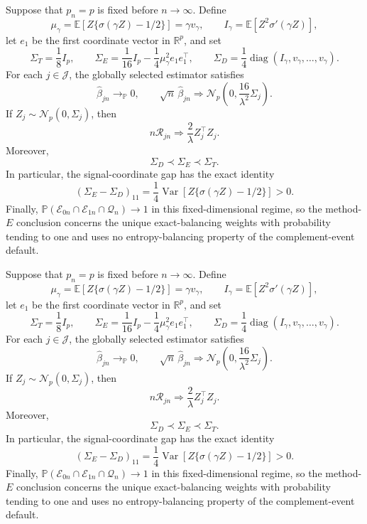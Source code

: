 Suppose that \(p_n=p\) is fixed before \(n\to\infty\).  Define
\[
 \mu_\gamma=\mathbb E\!\left[Z\{\sigma(\gamma Z)-1/2\}\right]
 =\gamma v_\gamma,
 \qquad
 I_\gamma=\mathbb E\!\left[Z^2\sigma'(\gamma Z)\right],
\]
let \(e_1\) be the first coordinate vector in \(\mathbb R^p\), and set
\[
 \Sigma_T=\frac18 I_p,
 \qquad
 \Sigma_E=\frac1{16}I_p-\frac14\mu_\gamma^2e_1e_1^\top,
 \qquad
 \Sigma_D=\frac14\operatorname{diag}(I_\gamma,v_\gamma,\ldots,v_\gamma).
\]
For each \(j\in\mathcal J\), the globally selected estimator satisfies
\[
 \widehat\beta_{jn}\longrightarrow_{\mathbb P}0,
 \qquad
 \sqrt n\,\widehat\beta_{jn}\Rightarrow
 \mathcal N_p\!\left(0,\frac{16}{\lambda^2}\Sigma_j\right).
\]
If \(Z_j\sim\mathcal N_p(0,\Sigma_j)\), then
\[
 n\mathcal R_{jn}\Rightarrow \frac2\lambda Z_j^\top Z_j.
\]
Moreover,
\[
 \Sigma_D\prec\Sigma_E\prec\Sigma_T.
\]
In particular, the signal-coordinate gap has the exact identity
\[
 (\Sigma_E-\Sigma_D)_{11}
 =\frac14\operatorname{Var}\!\left[Z\{\sigma(\gamma Z)-1/2\}\right]>0.
\]
Finally, \(\mathbb P(\mathcal E_{0n}\cap\mathcal E_{1n}\cap\mathcal Q_n)\to1\) in this fixed-dimensional regime, so the method-\(E\) conclusion concerns the unique exact-balancing weights with probability tending to one and uses no entropy-balancing property of the complement-event default.

Suppose that \(p_n=p\) is fixed before \(n\to\infty\).  Define
\[
 \mu_\gamma=\mathbb E\!\left[Z\{\sigma(\gamma Z)-1/2\}\right]
 =\gamma v_\gamma,
 \qquad
 I_\gamma=\mathbb E\!\left[Z^2\sigma'(\gamma Z)\right],
\]
let \(e_1\) be the first coordinate vector in \(\mathbb R^p\), and set
\[
 \Sigma_T=\frac18 I_p,
 \qquad
 \Sigma_E=\frac1{16}I_p-\frac14\mu_\gamma^2e_1e_1^\top,
 \qquad
 \Sigma_D=\frac14\operatorname{diag}(I_\gamma,v_\gamma,\ldots,v_\gamma).
\]
For each \(j\in\mathcal J\), the globally selected estimator satisfies
\[
 \widehat\beta_{jn}\longrightarrow_{\mathbb P}0,
 \qquad
 \sqrt n\,\widehat\beta_{jn}\Rightarrow
 \mathcal N_p\!\left(0,\frac{16}{\lambda^2}\Sigma_j\right).
\]
If \(Z_j\sim\mathcal N_p(0,\Sigma_j)\), then
\[
 n\mathcal R_{jn}\Rightarrow \frac2\lambda Z_j^\top Z_j.
\]
Moreover,
\[
 \Sigma_D\prec\Sigma_E\prec\Sigma_T.
\]
In particular, the signal-coordinate gap has the exact identity
\[
 (\Sigma_E-\Sigma_D)_{11}
 =\frac14\operatorname{Var}\!\left[Z\{\sigma(\gamma Z)-1/2\}\right]>0.
\]
Finally, \(\mathbb P(\mathcal E_{0n}\cap\mathcal E_{1n}\cap\mathcal Q_n)\to1\) in this fixed-dimensional regime, so the method-\(E\) conclusion concerns the unique exact-balancing weights with probability tending to one and uses no entropy-balancing property of the complement-event default.

